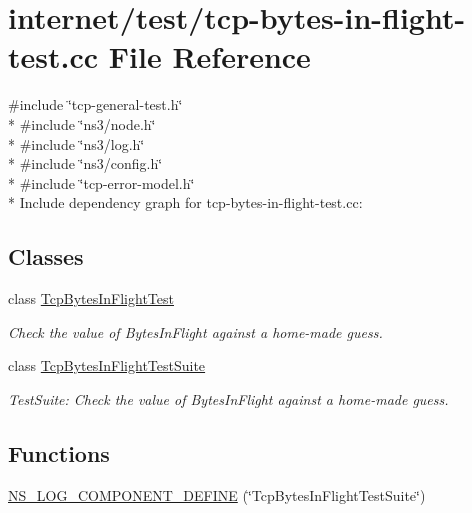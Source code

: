 \hypertarget{tcp-bytes-in-flight-test_8cc}{}\section{internet/test/tcp-\/bytes-\/in-\/flight-\/test.cc File Reference}
\label{tcp-bytes-in-flight-test_8cc}
{\ttfamily \#include \char`\"{}tcp-\/general-\/test.\+h\char`\"{}}\\*
{\ttfamily \#include \char`\"{}ns3/node.\+h\char`\"{}}\\*
{\ttfamily \#include \char`\"{}ns3/log.\+h\char`\"{}}\\*
{\ttfamily \#include \char`\"{}ns3/config.\+h\char`\"{}}\\*
{\ttfamily \#include \char`\"{}tcp-\/error-\/model.\+h\char`\"{}}\\*
Include dependency graph for tcp-\/bytes-\/in-\/flight-\/test.cc\+:
\subsection*{Classes}
\begin{DoxyCompactItemize}
\item 
class \hyperlink{classTcpBytesInFlightTest}{Tcp\+Bytes\+In\+Flight\+Test}
\begin{DoxyCompactList}\small\item\em Check the value of Bytes\+In\+Flight against a home-\/made guess. \end{DoxyCompactList}\item 
class \hyperlink{classTcpBytesInFlightTestSuite}{Tcp\+Bytes\+In\+Flight\+Test\+Suite}
\begin{DoxyCompactList}\small\item\em Test\+Suite\+: Check the value of Bytes\+In\+Flight against a home-\/made guess. \end{DoxyCompactList}\end{DoxyCompactItemize}
\subsection*{Functions}
\begin{DoxyCompactItemize}
\item 
\hyperlink{tcp-bytes-in-flight-test_8cc_ac67ced885dfd504d234b99948292fd8e}{N\+S\+\_\+\+L\+O\+G\+\_\+\+C\+O\+M\+P\+O\+N\+E\+N\+T\+\_\+\+D\+E\+F\+I\+NE} (\char`\"{}Tcp\+Bytes\+In\+Flight\+Test\+Suite\char`\"{})
\end{DoxyCompactItemize}
